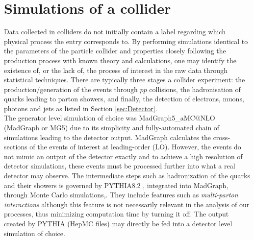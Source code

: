 \section{Simulations of a collider}
\label{sec:Sims}
Data collected in colliders do not initially contain a label regarding which physical process the entry corresponds to. By performing simulations identical to the parameters of the particle collider and properties closely following the production process with known theory and calculations, one may identify the existence of, or the lack of, the process of interest in the raw data through statistical techniques. There are typically three stages a collider experiment: the production/generation of the events through $pp$ collisions, the hadronisation of quarks leading to parton showers, and finally, the detection of electrons, muons, photons and jets as listed in Section \ref{sec:Detector}. \\

The generator level simulation of choice was MadGraph5\_aMC@NLO \cite{alwall2014automated} (MadGraph or MG5) due to its simplicity and fully-automated chain of simulations leading to the detector output. MadGraph calculates the cross-sections of the events of interest at leading-order (LO). However, the events do not mimic an output of the detector exactly and to achieve a high resolution of detector simulations, these events must be processed further into what a real detector may observe. The intermediate steps such as hadronization of the quarks and their showers is governed by PYTHIA8.2 \cite{sjostrand2015introduction}, integrated into MadGraph, through Monte Carlo simulations,. They include features such as \textit{multi-parton interactions} although this feature is not necessarily relevant in the analysis of our processes, thus minimizing computation time by turning it off. The output created by PYTHIA (HepMC files) may directly be fed into a detector level simulation of choice. \\

